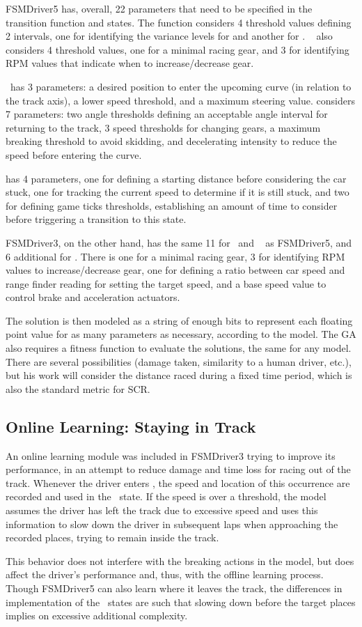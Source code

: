 FSMDriver5 has, overall, 22 parameters that need to be specified in the transition function and states. The function considers 4 threshold values defining 2 intervals, one for identifying the variance levels for \SL and another for \AC. \SL~ also considers 4 threshold values, one for a minimal racing gear, and 3 for identifying RPM values that indicate when to increase/decrease gear.

\AC~has 3 parameters: a desired position to enter the upcoming curve (in relation to the track axis), a lower speed threshold, and a maximum steering value. \OT considers 7 parameters: two angle thresholds defining an acceptable angle interval for returning to the track, 3 speed thresholds for changing gears, a maximum breaking threshold to avoid skidding, and decelerating intensity to reduce the speed before entering the curve.

\St has 4 parameters, one for defining a starting distance before considering the car stuck, one for tracking the current speed to determine if it is still stuck, and two for defining game ticks thresholds, establishing an amount of time to consider before triggering a transition to this state.

FSMDriver3, on the other hand, has the same 11 for \OT~and \St~ as FSMDriver5, and 6 additional for \IT. There is one for a minimal racing gear, 3 for identifying RPM values to increase/decrease gear, one for defining a ratio between car speed and range finder reading for setting the target speed, and a base speed value to control brake and acceleration actuators.

The solution is then modeled as a string of enough bits to represent each floating point value for as many parameters as necessary, according to the model. The GA also requires a fitness function to evaluate the solutions, the same for any model. There are several possibilities (damage taken, similarity to a human driver, etc.), but his work will consider the distance raced during a fixed time period, which is also the standard metric for SCR.

\subsection{Online Learning: Staying in Track}%
An online learning module was included in FSMDriver3 trying to improve its performance, in an attempt to reduce damage and time loss for racing out of the track. Whenever the driver enters \OT, the speed and location of this occurrence are recorded and used in the \racing~state. If the speed is over a threshold, the model assumes the driver has left the track due to excessive speed and uses this information to slow down the driver in subsequent laps when approaching the recorded places, trying to remain inside the track.

This behavior does not interfere with the breaking actions in the model, but does affect the driver's performance and, thus, with the offline learning process. Though FSMDriver5 can also learn where it leaves the track, the differences in implementation of the \racing~states are such that slowing down before the target places implies on excessive additional complexity.